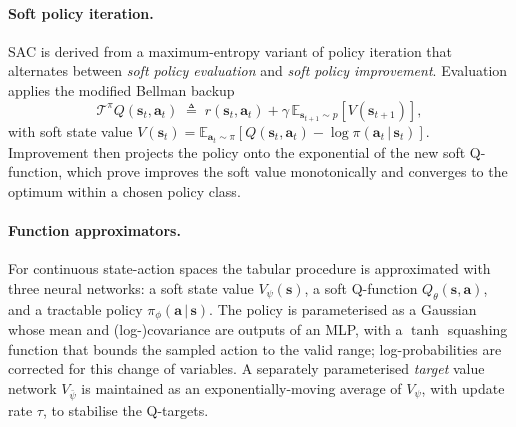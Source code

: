 \documentclass{article}
\begin{document}
\paragraph{Soft policy iteration.}
SAC is derived from a maximum-entropy variant of policy iteration that alternates between \emph{soft policy evaluation} and \emph{soft policy improvement}. Evaluation applies the modified Bellman backup
\begin{equation}
    \mathcal{T}^\pi Q(\mathbf{s}_t,\mathbf{a}_t) \;\triangleq\;
    r(\mathbf{s}_t,\mathbf{a}_t) + \gamma\,
    \mathbb{E}_{\mathbf{s}_{t+1}\sim p}\!\left[V(\mathbf{s}_{t+1})\right],
\end{equation}
with soft state value $V(\mathbf{s}_t) = \mathbb{E}_{\mathbf{a}_t\sim\pi}\!\left[Q(\mathbf{s}_t,\mathbf{a}_t) - \log \pi(\mathbf{a}_t\,|\,\mathbf{s}_t)\right]$. Improvement then projects the policy onto the exponential of the new soft Q-function, which \citet{haarnoja2018soft} prove improves the soft value monotonically and converges to the optimum within a chosen policy class.

\paragraph{Function approximators.}
For continuous state-action spaces the tabular procedure is approximated with three neural networks: a soft state value $V_\psi(\mathbf{s})$, a soft Q-function $Q_\theta(\mathbf{s},\mathbf{a})$, and a tractable policy $\pi_\phi(\mathbf{a}\,|\,\mathbf{s})$. The policy is parameterised as a Gaussian whose mean and (log-)covariance are outputs of an MLP, with a $\tanh$ squashing function that bounds the sampled action to the valid range; log-probabilities are corrected for this change of variables. A separately parameterised \emph{target} value network $V_{\bar\psi}$ is maintained as an exponentially-moving average of $V_\psi$, with update rate $\tau$, to stabilise the Q-targets.
\end{document}
